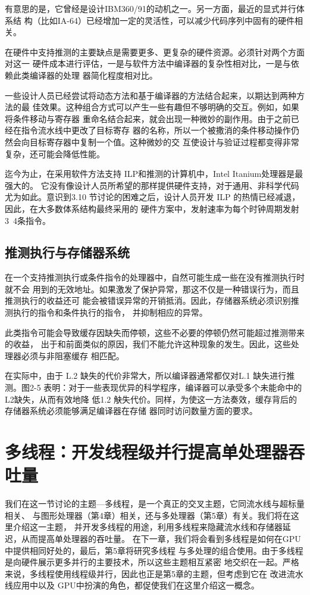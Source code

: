 有意思的是，它曾经是设计IBM360/91的动机之一。另一方面，最近的显式并行体系结
构（比如IA-64）已经增加一定的灵活性，可以减少代码序列中固有的硬件相关。

在硬件中支持推测的主要缺点是需要更多、更复杂的硬件资源。必须针对两个方面对这一
硬件成本进行评估，一是与软件方法中编译器的复杂性相对比，一是与依赖此类编译器的处理
器简化程度相对比。

一些设计人员已经尝试将动态方法和基于编译器的方法结合起来，以期达到两种方法的最
佳效果。这种组合方式可以产生一些有趣但不够明确的交互。例如，如果将条件移动与寄存器
重命名结合起来，就会出现一种微妙的副作用。由于之前已经在指令流水线中更改了目标寄存
器的名称，所以一个被撒消的条件移动操作仍然会向目标寄存器中复制一个值。这种微妙的交
互使设计与验证过程都变得非常复杂，还可能会降低性能。

迄今为止，在采用软件方法支持 ILP和推测的计算机中，Intel Itanium处理器是最强大的。
它没有像设计人员所希望的那样提供硬件支持，对于通用、非科学代码尤为如此。意识到3.10
节讨论的困难之后，设计人员开发 ILP 的热情已经减退，因此，在大多数体系结构最终采用的
硬件方案中，发射速率为每个时钟周期发射3~4条指令。
\subsection{推测执行与存储器系统}
在一个支持推测执行或条件指令的处理器中，自然可能生成一些在没有推测执行时就不会
用到的无效地址。如果激发了保护异常，那这不仅是一种错误行为，而且推测执行的收益还可
能会被错误异常的开销抵消。因此，存储器系统必须识别推测执行的指令和条件执行的指令，
并抑制相应的异常。

此类指令可能会导致缓存因缺失而停顿，这些不必要的停顿仍然可能超过推测带来的收益，
出于和前面类似的原因，我们不能允许这种现象的发生。因此，这些处理器必须与非阻塞缓存
相匹配。

在实际中，由于 L.2 缺失的代价非常大，所以编译器通常都仅对L.1 缺失进行推测。图2-5
表明：对于一些表现优异的科学程序，编译器可以承受多个未能命中的L2缺失，从而有效地降
低1.2 觖失代价。同样，为使这一方法奏效，缓存背后的存储器系统必须能够满足编译器在存储
器同时访问数量方面的要求。
\section{多线程：开发线程级并行提高单处理器吞吐量}
我们在这一节讨论的主题—多线程，是一个真正的交叉主题，它同流水线与超标量相关、
与图形处理器（第4章）相关，还与多处理器（第5章）有关。我们将在这里介绍这一主题，
并开发多线程的用途，利用多线程来隐藏流水线和存储器延迟，从而提高单处理器的吞吐量。
在下一章，我们将会看到多线程是如何在GPU 中提供相同好处的，最后，第5章将研究多线程
与多处理的组合使用。由于多线程是向硬件展示更多并行的主要技术，所以这些主题相互紧密
地交织在一起。严格来说，多线程使用线程级并行，因此也正是第5章的主题，但考虑到它在
改进流水线应用中以及 GPU中扮演的角色，都促使我们在这里介绍这一概念。

